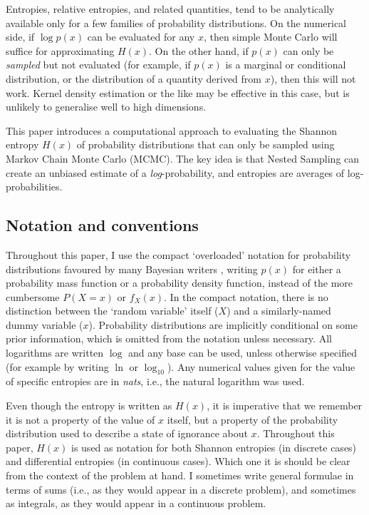 \documentclass[entropy,article,accept,oneauthor,pdftex,10pt,a4paper]{mdpi}
\newcommand{\revision}{\color{darkblue}}
\begin{document}
Entropies, {\revision relative entropies}, and related quantities,
tend to be analytically available only for
a few families of probability distributions. On the numerical side, if
$\log p(x)$ can be evaluated for any $x$, then simple Monte Carlo will suffice
for approximating $H(x)$. On the other hand, if $p(x)$ can only be
{\em sampled} but not evaluated (for example, if $p(x)$ is a marginal {\revision or
conditional distribution, or the distribution of a quantity derived from $x$)},
then this will not work. Kernel density estimation or the like
\citep[e.g.][]{JMLR:v15:szabo14a}
may be effective in this case, but is unlikely to generalise well to high
dimensions.

This paper introduces a computational approach to evaluating the Shannon
entropy $H(x)$ of probability distributions that can only be sampled
using Markov Chain Monte Carlo (MCMC). {\revision The key idea is that Nested Sampling
can create an unbiased estimate of a {\em log}-probability, and entropies
are averages of log-probabilities}.

\subsection{Notation and conventions}

Throughout this paper, I use the compact
`overloaded' notation for probability distributions favoured by many
Bayesian writers \citep{jaynes2003probability, mackay2003information},
writing $p(x)$ for either a probability mass function
or a probability density function, instead
of the more cumbersome $P(X=x)$ or $f_X(x)$.
In the compact notation, there is no distinction between the
`random variable' itself ($X$) and a similarly-named dummy variable ($x$).
Probability distributions are implicitly conditional on some prior
information, which is omitted from the notation unless necessary.
All logarithms are written $\log$ and any base can be used, unless otherwise
specified (for example by writing $\ln$ or $\log_{10}$). Any numerical
values given for the value of specific entropies are in {\em nats}, i.e.,
the natural logarithm was used.

Even though the entropy is written as $H(x)$, it is imperative that we
remember it is not a property of the value of $x$ itself, but a property
of the probability distribution used to describe a state of ignorance about $x$.
Throughout this paper, $H(x)$ is used as notation for both Shannon entropies
(in discrete cases) and differential entropies (in continuous cases). Which
one it is should be clear from the context of the problem at hand.
I sometimes write general formulae in terms of sums (i.e., as they would
appear in a discrete problem), and sometimes as integrals, as they would
appear in a continuous problem.
\end{document}
